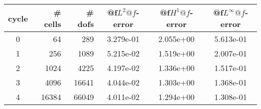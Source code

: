 \documentclass[10pt]{report}
\begin{document}
\begin{table}[H]
\begin{center}
\begin{tabular}{|c|r|r|c|c|c|} \hline
cycle & \# cells & \# dofs & @f$L^2@f$-error & @f$H^1@f$-error & @f$L^\infty@f$-error\\ \hline
0 & 64 & 289 & 3.279e-01 & 2.055e+00 & 5.613e-01\\ \hline
1 & 256 & 1089 & 5.215e-02 & 1.519e+00 & 2.007e-01\\ \hline
2 & 1024 & 4225 & 4.197e-02 & 1.336e+00 & 1.517e-01\\ \hline
3 & 4096 & 16641 & 4.044e-02 & 1.303e+00 & 1.368e-01\\ \hline
4 & 16384 & 66049 & 4.011e-02 & 1.294e+00 & 1.308e-01\\ \hline
\end{tabular}
\end{center}
\end{table}
\end{document}
